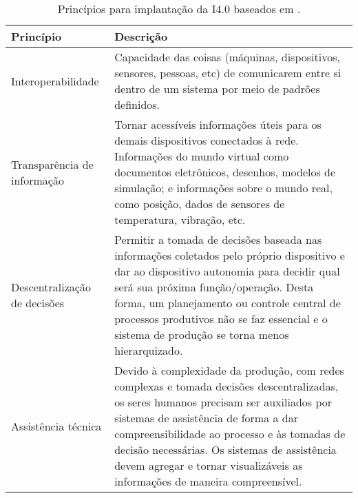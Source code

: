 \begin{table}[htb]
	\centering
	\footnotesize
	\begin{tabular}{p{3cm}p{12cm}}
		\hline
		\textbf{Princípio}           & \textbf{Descrição}                                                                                                                                                                                                                                                                                                           \\

		\hline
		Interoperabilidade           &
		Capacidade das coisas (máquinas, dispositivos, sensores, pessoas, etc) de comunicarem entre si dentro de um sistema por meio de padrões definidos.                                                                                                                                                                                                          \\

		\hline
		Transparência de informação  &
		Tornar acessíveis informações úteis para os demais dispositivos conectados à rede. Informações do mundo virtual como documentos eletrônicos, desenhos, modelos de simulação; e informações sobre o mundo real, como posição, dados de sensores de temperatura, vibração, etc.                                                                               \\

		\hline
		Descentralização de decisões &
		Permitir a tomada de decisões baseada nas informações coletados pelo próprio dispositivo e dar ao dispositivo autonomia para decidir qual será sua próxima função/operação. Desta forma, um planejamento ou controle central de processos produtivos não se faz essencial e o sistema de produção se torna menos hierarquizado.                             \\

		\hline
		Assistência técnica          &
		Devido à complexidade da produção, com redes complexas e tomada decisões descentralizadas, os seres humanos precisam ser auxiliados por sistemas de assistência de forma a dar compreensibilidade ao processo e às tomadas de decisão necessárias. Os sistemas de assistência devem agregar e tornar visualizáveis as informações de maneira compreensível. \\

		\hline
	\end{tabular}
	\caption{Princípios para implantação da I4.0 baseados em .}
	\label{tab:principios-i4}
\end{table}

